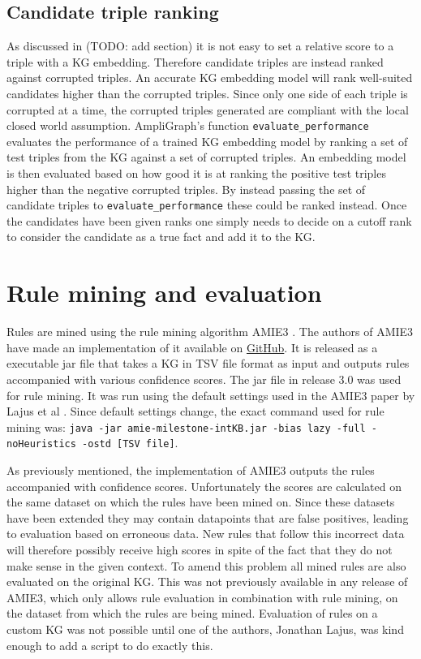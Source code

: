 \subsection{Candidate triple ranking}
As discussed in (TODO: add section) it is not easy to set a relative score to a triple with a KG embedding. Therefore candidate triples are instead ranked against corrupted triples. An accurate KG embedding model will rank well-suited candidates higher than the corrupted triples. Since only one side of each triple is corrupted at a time, the corrupted triples generated are compliant with the local closed world assumption. AmpliGraph's function \texttt{evaluate\_performance} evaluates the performance of a trained KG embedding model by ranking a set of test triples from the KG against a set of corrupted triples. An embedding model is then evaluated based on how good it is at ranking the positive test triples higher than the negative corrupted triples. By instead passing the set of candidate triples to \texttt{evaluate\_performance} these could be ranked instead. Once the candidates have been given ranks one simply needs to decide on a cutoff rank to consider the candidate as a true fact and add it to the KG.


\section{Rule mining and evaluation}
Rules are mined using the rule mining algorithm AMIE3 \cite{amie3}. The authors of AMIE3 have made an implementation of it available on \hyperlink{https://github.com/lajus/amie}{GitHub}. It is released as a executable jar file that takes a KG in TSV file format as input and outputs rules accompanied with various confidence scores. The jar file in release 3.0 was used for rule mining. It was run using the default settings used in the AMIE3 paper by Lajus et al \cite{amie3}. Since default settings change, the exact command used for rule mining was: \texttt{java -jar amie-milestone-intKB.jar -bias lazy -full -noHeuristics -ostd [TSV file]}.

As previously mentioned, the implementation of AMIE3 outputs the rules accompanied with confidence scores. Unfortunately the scores are calculated on the same dataset on which the rules have been mined on. Since these datasets have been extended they may contain datapoints that are false positives, leading to evaluation based on erroneous data. New rules that follow this incorrect data will therefore possibly receive high scores in spite of the fact that they do not make sense in the given context. To amend this problem all mined rules are also evaluated on the original KG.
This was not previously available in any release of AMIE3, which only allows rule evaluation in combination with rule mining, on the dataset from which the rules are being mined. Evaluation of rules on a custom KG was not possible until one of the authors, Jonathan Lajus, was kind enough to add a script to do exactly this.

